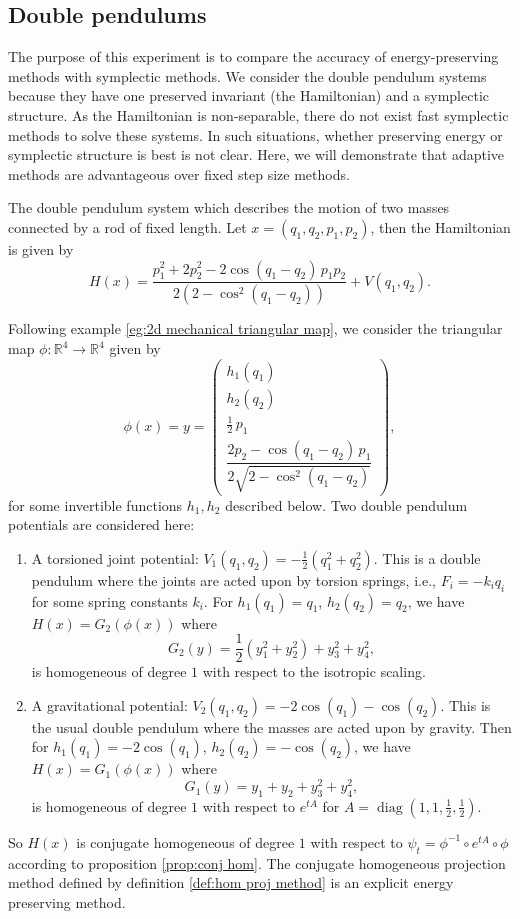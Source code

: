 \documentclass[final,3p,times]{elsarticle}
\newcommand{\R}{\mathbb{R}}
\begin{document}
\subsection{Double pendulums}
The purpose of this experiment is to compare the accuracy of energy-preserving methods with symplectic methods. We consider the double pendulum systems because they have one preserved invariant (the Hamiltonian) and a symplectic structure. As the Hamiltonian is non-separable, there do not exist fast symplectic methods to solve these systems. In such situations, whether preserving energy or symplectic structure is best is not clear. Here, we will demonstrate that adaptive methods are advantageous over fixed step size methods. 

The double pendulum system which describes the motion of two masses connected by a rod of fixed length. Let $x=(q_1, q_2, p_1, p_2)$, then the Hamiltonian is given by 
\[
H(x)=
\frac{p_{1}^{2}+2p_{2}^{2}-2\cos(q_{1}-q_{2})\,p_{1}p_{2}}
{2\left(2-\cos^{2}(q_{1}-q_{2})\right)}
+V(q_{1}, q_{2}).
\]

Following example \ref{eg:2d mechanical triangular map}, we consider the triangular map $\phi:\R^4\to\R^4$ given by
\begin{equation}\label{eq:dp diffeo}
  \phi(x)=y=\begin{pmatrix}
h_1(q_1)\\[2pt]
h_2(q_2)\\[2pt]
\tfrac{1}{2}\,p_{1}\\[6pt]
\dfrac{2p_{2}-\cos(q_{1}-q_{2})\,p_{1}}{2\sqrt{2-\cos^{2}(q_{1}-q_{2})}}
\end{pmatrix},
\end{equation}
for some invertible functions $h_1, h_2$ described below. Two double pendulum potentials are considered here:
\begin{enumerate}
  \item A torsioned joint potential: $V_1(q_1,q_2)=-\frac{1}{2}(q_1^2+q_2^2)$. This is a double pendulum where the joints are acted upon by torsion springs, i.e., $F_i=-k_i q_i$ for some spring constants $k_i$. For $h_1(q_1)=q_1$, $h_2(q_2)=q_2$, we have $H(x)=G_2(\phi(x))$ where
  $$G_2(y)=\frac{1}{2}(y_1^2+y_2^2)+y_3^2+y_4^2,$$
  is homogeneous of degree $1$ with respect to the isotropic scaling.
  \item A gravitational potential: $V_2(q_1,q_2)=-2\cos(q_1)-\cos(q_2)$. This is the usual double pendulum where the masses are acted upon by gravity. Then for $h_1(q_1)=-2\cos(q_1)$, $h_2(q_2)=-\cos(q_2)$, we have $H(x)=G_1(\phi(x))$ where
  $$G_1(y)=y_1+y_2+y_3^2+y_4^2,$$
  is homogeneous of degree $1$ with respect to $e^{tA}$ for $A=\operatorname{diag}(1,1,\tfrac{1}{2},\tfrac{1}{2})$.
\end{enumerate}
So $H(x)$ is conjugate homogeneous of degree $1$ with respect to $\psi_t=\phi^{-1}\circ e^{tA}\circ\phi$ according to proposition \ref{prop:conj hom}. The conjugate homogeneous projection method defined by definition \ref{def:hom proj method} is an explicit energy preserving method. 
\end{document}
